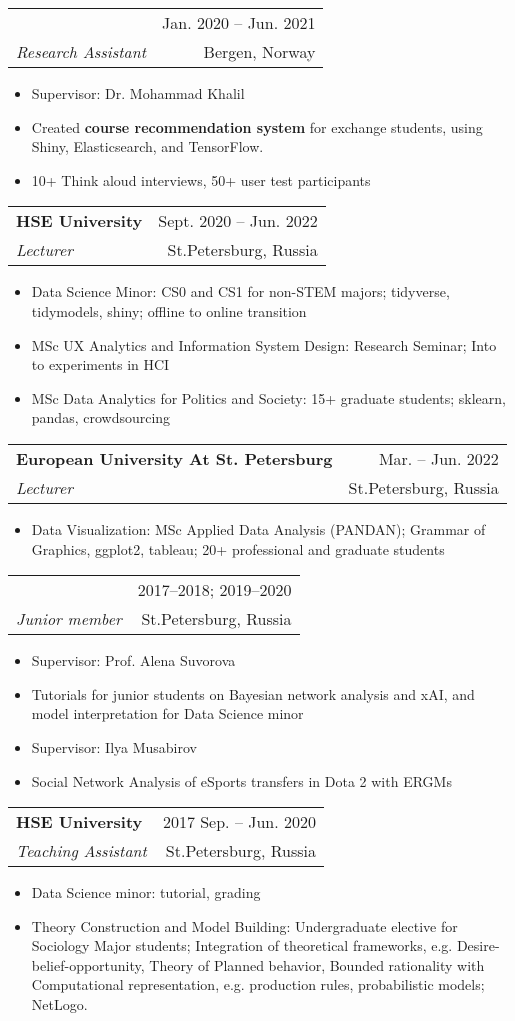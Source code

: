 \documentclass[letterpaper,11pt]{article}
\makeatletter
\newcommand{\myuline}[1]{%
  \uline{\phantom{#1}}%
  \llap{\contour{white}{#1}}%
}
\newcommand{\MYhref}[2]{
\myuline{\href{#1}{{#2}}}
}%
\newcommand{\resumeItem}[1]{
  \item\small{
    {#1 \vspace{-1pt}}
  }
}
\newcommand{\resumeSubheading}[4]{
  \vspace{-10pt}\item
    \begin{tabular*}{\textwidth}[t]{l@{\extracolsep{\fill}}r}
      \textbf{#1} & {\color{dark-grey}\small #2}\vspace{1pt}\\ %
      \textit{#3} & {\color{dark-grey} \small #4}\\ %
    \end{tabular*}\vspace{-4pt}
}
\newcommand{\resumeItemListStart}{\begin{itemize}[label={-}]}
\newcommand{\resumeItemListEnd}{\end{itemize}\vspace{0pt}}
\makeatother
\begin{document}
    \resumeSubheading
      {\MYhref{https://slate.uib.no}{SLATE} Center at University of Bergen}{Jan. 2020 -- Jun. 2021}
      {Research Assistant}{Bergen, Norway}
      \resumeItemListStart
        \resumeItem{Supervisor: Dr. Mohammad Khalil}
        \resumeItem{Created \textbf{course recommendation system} for exchange students, using Shiny, Elasticsearch, and TensorFlow.}
        \resumeItem{10+ Think aloud interviews, 50+ user test participants}
    \resumeItemListEnd

    \resumeSubheading
      {HSE University}{Sept. 2020 -- Jun. 2022}
      {Lecturer}{St.Petersburg, Russia}
      \resumeItemListStart
        \resumeItem{Data Science Minor: CS0 and CS1 for non-STEM majors; tidyverse, tidymodels, shiny; offline to online transition}
        \resumeItem{MSc UX Analytics and Information System Design: Research Seminar; Into to experiments in HCI}
        \resumeItem{MSc Data Analytics for Politics and Society: 15+ graduate students; sklearn, pandas, crowdsourcing}
      \resumeItemListEnd
    \resumeSubheading
      {European University At St. Petersburg}{Mar. -- Jun. 2022}
      {Lecturer}{St.Petersburg, Russia}
      \resumeItemListStart
        \resumeItem{Data Visualization: MSc Applied Data Analysis (PANDAN); Grammar of Graphics, ggplot2, tableau; 20+ professional and graduate students}
      \resumeItemListEnd

    \resumeSubheading
    {\MYhref{https://spb.hse.ru/en/fmcs/math/sociocomp/}{SocComp} research group at HSE University}{2017--2018; 2019--2020}
    {Junior member}{St.Petersburg, Russia}
        \resumeItemListStart
        \resumeItem{Supervisor: Prof. Alena Suvorova}
        \resumeItem{Tutorials for junior students on Bayesian network analysis and xAI, and model interpretation for Data Science minor}
        \resumeItem{Supervisor: Ilya Musabirov}
        \resumeItem{Social Network Analysis of eSports transfers in Dota 2 with ERGMs}
        \resumeItemListEnd

        \resumeSubheading
    {HSE University}{2017 Sep. -- Jun. 2020}
    {Teaching Assistant}{St.Petersburg, Russia}
        \resumeItemListStart
        \resumeItem{Data Science minor: tutorial, grading}
        \resumeItem{Theory Construction and Model Building: Undergraduate elective for Sociology Major students; Integration of theoretical frameworks, e.g. Desire-belief-opportunity, Theory of Planned behavior, Bounded rationality with Computational representation, e.g. production rules,  probabilistic models; NetLogo.}
        \resumeItemListEnd
\end{document}
